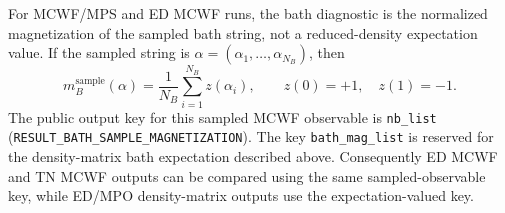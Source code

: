 \documentclass[aps,pra,twocolumn,superscriptaddress,nolongbibliography,nobalancelastpage,10pt]{revtex4-2}
\begin{document}
For MCWF/MPS and ED MCWF runs, the bath diagnostic is the normalized
magnetization of the sampled bath string, not a reduced-density expectation
value.  If the sampled string is \(\alpha=(\alpha_1,\ldots,\alpha_{N_B})\),
then
\begin{equation}
	m_B^{\mathrm{sample}}(\alpha)
	=\frac{1}{N_B}\sum_{i=1}^{N_B} z(\alpha_i),
	\qquad z(0)=+1,\quad z(1)=-1 .
\end{equation}
The public output key for this sampled MCWF observable is \texttt{nb\_list}
(\texttt{RESULT\_BATH\_SAMPLE\_MAGNETIZATION}).  The key
\texttt{bath\_mag\_list} is reserved for the density-matrix bath expectation
described above.  Consequently ED MCWF and TN MCWF outputs can be compared
using the same sampled-observable key, while ED/MPO density-matrix outputs use
the expectation-valued key.
\end{document}
